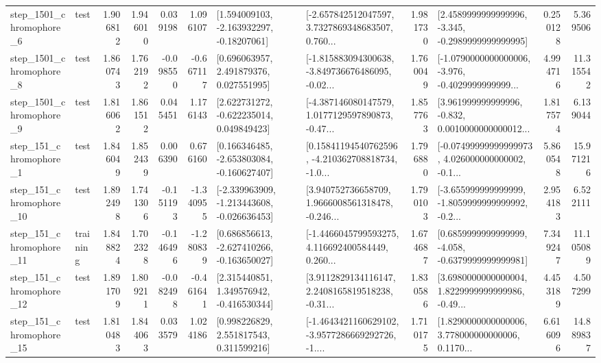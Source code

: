 \begin{tabular}{llrrrrllrlrr}
  step\_1501\_chromophore\_6 &      test &      1.906812 &    1.946010 &      0.039198 &  1.096107 &    [1.594009103, -2.163932297, -0.18207061] &  [-2.657842512047597, 3.7327869348683507, 0.760... &       1.981730 &  [2.4589999999999996, -3.345, -0.2989999999999995] &            0.250128 &          5.369506 \\
  step\_1501\_chromophore\_8 &      test &      1.860743 &    1.762192 &     -0.098550 & -0.667117 &     [0.696063957, 2.491879376, 0.027551995] &  [-1.815883094300638, -3.849736676486095, -0.02... &       1.760049 &  [-1.0790000000000006, -3.976, -0.4029999999999... &            4.994716 &         11.315542 \\
  step\_1501\_chromophore\_9 &      test &      1.816062 &    1.861512 &      0.045451 &  1.176143 &    [2.622731272, -0.622235014, 0.049849423] &  [-4.387146080147579, 1.0177129597890873, -0.47... &       1.857763 &  [3.961999999999996, -0.832, 0.0010000000000012... &            1.817574 &          6.139044 \\
   step\_151\_chromophore\_1 &      test &      1.846049 &    1.852439 &      0.006390 &  0.676160 &   [0.166346485, -2.653803084, -0.160627407] &  [0.15841194540762596, -4.210362708818734, -1.0... &       1.796880 &  [-0.07499999999999973, 4.026000000000002, -0.1... &            5.860548 &         15.971216 \\
  step\_151\_chromophore\_10 &      test &      1.892498 &    1.741306 &     -0.151193 & -1.340955 &  [-2.339963909, -1.213443608, -0.026636453] &  [3.940752736658709, 1.9666008561318478, -0.246... &       1.790103 &  [-3.655999999999999, -1.8059999999999992, -0.2... &            2.954183 &          6.522111 \\
  step\_151\_chromophore\_11 &  training &      1.848824 &    1.702328 &     -0.146496 & -1.280839 &   [0.686856613, -2.627410266, -0.163650027] &  [-1.4466045799593275, 4.116692400584449, 0.260... &       1.674687 &  [0.6859999999999999, -4.058, -0.6379999999999981] &            7.349247 &         11.105089 \\
  step\_151\_chromophore\_12 &      test &      1.891709 &    1.809211 &     -0.082498 & -0.461641 &    [2.315440851, 1.349576942, -0.416530344] &  [3.9112829134116147, 2.2408165819518238, -0.31... &       1.830586 &  [3.6980000000000004, 1.8229999999999986, -0.49... &            4.453189 &          4.507299 \\
  step\_151\_chromophore\_15 &      test &      1.810483 &    1.844063 &      0.033579 &  1.024186 &     [0.998226829, 2.551817543, 0.311599216] &  [-1.4643421160629102, -3.9577286669292726, -1.... &       1.710175 &  [1.8290000000000006, 3.778000000000006, 0.1170... &            6.616096 &         14.889837 \\

\end{tabular}
